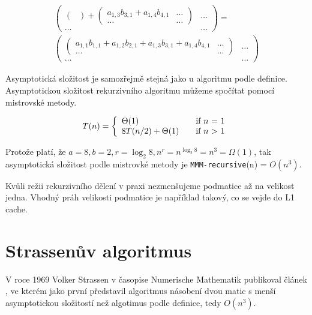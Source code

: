 \begin{align}
\begin{pmatrix}
\begin{pmatrix}
\end{pmatrix} + 
\begin{pmatrix}
 a_{1,3} b_{3,1}+a_{1,4} b_{4,1} & \hdots \\
 \hdots & \hdots
\end{pmatrix} &
\hdots \\
\hdots & \hdots
\end{pmatrix} = \\
\begin{pmatrix}
\begin{pmatrix}
 a_{1,1} b_{1,1}+a_{1,2} b_{2,1}+a_{1,3} b_{3,1}+a_{1,4} b_{4,1} & \hdots \\
\hdots & \hdots
\end{pmatrix} &
\hdots \\\hdots & \hdots
\end{pmatrix}
\end{align}

Asymptotická složitost je samozřejmě stejná jako u algoritmu podle definice. Asymptotickou složitost rekurzivního algoritmu můžeme spočítat pomocí mistrovské metody.

\[ T(n) = \left\{ 
  \begin{array}{l l}
    \Theta(1) & \quad \text{if $n$ = 1}\\
    8T(n/2) + \Theta(1) & \quad \text{if $n$ > 1}
  \end{array} \right.\]

Protože platí, že $a=8, b=2, r=\log_{2} 8, n^r=n^{\log_{2} 8}=n^3=\Omega(1)$, tak asymptotická složitost podle mistrovké metody je \texttt{MMM-recursive}(n) = $O(n^3)$.

Kvůli režii rekurzivního dělení v praxi nezmenšujeme podmatice až na velikost jedna. Vhodný práh velikosti podmatice je například takový, co se vejde do L1 cache.

\section{Strassenův algoritmus} %

V roce 1969 Volker Strassen v časopise Numerische Mathematik publikoval článek \cite{GEMnO}, ve kterém jako první představil algoritmus násobení dvou matic s menší asymptotickou složitostí než algotimus podle definice, tedy $O(n^3)$.

